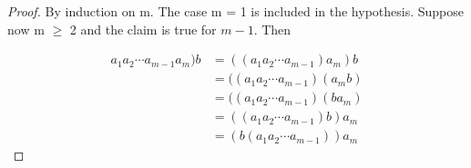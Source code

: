 \documentclass[11pt]{amsbook}
\begin{document}
\begin{proof}
By induction on m. The case m = 1 is included in the hypothesis.
Suppose now m $\geq$ 2 and the claim is true for $m-1$. Then

\begin{align*}
	a_{1}a_{2}\dotsb a_{m-1}a_{m})b
	&=((a_{1}a_{2}\dotsb a_{m-1})a_{m})b\\
	&= ((a_{1}a_{2}\dotsb a_{m-1})(a_{m}b)\\
	&= ((a_{1}a_{2}\dotsb a_{m-1})(ba_{m})\\
	&= ((a_{1}a_{2}\dotsb a_{m-1})b)a_{m}\\
	&= (b(a_{1}a_{2}\dotsb a_{m-1}))a_{m}
\end{align*}

\end{proof}
\end{document}
